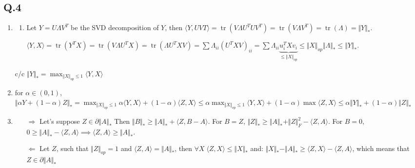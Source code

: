 \documentclass[12pt]{article}\usepackage[]{graphicx}\usepackage[]{color}
\newcommand{\Q}[1]{\subsection*{Q.#1}}
\newenvironment{question}[1]
{\Q{#1}}{}
\newcommand{\norm}[1]{\Vert #1 \Vert}
\DeclareMathOperator{\tr}{tr}
\begin{document}
\begin{question}{4}
  \begin{enumerate}
  \item 
    \begin{enumerate}
    \item
      Let $Y = U\Lambda V^T$ be the SVD decomposition of $Y$,
      then $\langle Y, UVT\rangle  = \tr(V\Lambda U^TUV^T) = \tr(V\Lambda V^T) = \tr(\Lambda) = \Vert Y\Vert _*$.


      $\langle Y, X\rangle  = \tr(Y^TX) = \tr(V \Lambda U^TX) = \tr(\Lambda U^TXV) = \sum \Lambda_{ii} (U^TXV)_{ii}  = \sum \Lambda_{ii} \underbrace{u_i^TXv_i}_{\le \Vert X\Vert _{op}} \le  \Vert X\Vert _{op} \Vert \Lambda\Vert _* \le \Vert Y\Vert _*$.


    \end{enumerate}
    c/c $\Vert Y\Vert _* = \max_{\Vert X\Vert _{op} \le 1} \langle Y, X\rangle $

  \item for $\alpha \in (0, 1)$,
    $\Vert \alpha Y + (1-\alpha)Z\Vert _* = \max_{\Vert X\Vert _{op} \le 1} \alpha \langle Y, X\rangle  + (1-\alpha) \langle Z, X\rangle  \le \alpha \max_{\Vert X\Vert _{op} \le 1} \langle Y, X\rangle  + (1-\alpha) \max \langle Z, X\rangle  \le \alpha \Vert Y\Vert _* + (1-\alpha) \Vert Z\Vert _*$
  \item
    \begin{enumerate}
    \item[$\Rightarrow$] Let's suppose $Z \in \partial \Vert A \Vert _*$
      Then $\norm{B}_* \ge \norm{A}_* + \langle Z, B - A\rangle $.
      For $B = Z$, $\norm{Z}_* \ge \norm{A}_* + \norm{Z}_F^2 - \langle Z, A\rangle $.
      For $B = 0$,  $0 \ge \norm{A}_* - \langle Z, A\rangle \implies \langle Z, A\rangle \ge \norm{A}_*$.
    \item[$\Leftarrow$]Let $Z$, such that $\norm{Z}_{op} = 1$ and $\langle Z, A\rangle  = \norm{A}_*$, then $\forall X \;  \langle Z, X\rangle  \le \norm{X}_*$ and:
      $\norm{X}_* - \norm{A}_* \ge \langle Z, X\rangle  - \langle Z, A\rangle $, which means that $Z \in \partial \norm{A}_*$
      

\end{enumerate}
\end{enumerate}
\end{question}
\end{document}
